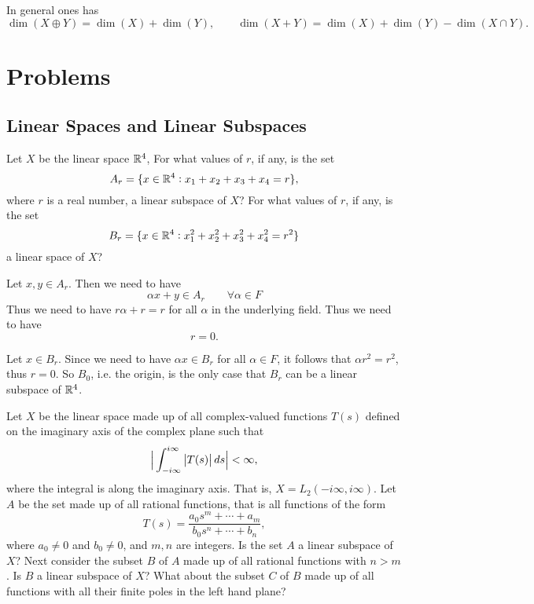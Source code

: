 \begin{proposition}
	In general ones has
	\[ \dim(X\oplus Y) = \dim(X) + \dim (Y), \qquad \dim(X+Y) = \dim(X) +\dim(Y) - \dim(X\cap Y). \]
\end{proposition}
 
 


\section{Problems}

\subsection{Linear Spaces and Linear Subspaces}
\begin{problem}
	Let $ X $ be the linear space $ \mathbb{R}^4 $, For what values of $ r $, if any, is the set
	\[ A_r = \{x\in\mathbb{R}^4: x_1+x_2+x_3+x_4 = r\}, \]
	where $ r $ is a real number, a linear subspace of $ X $? For what values of $ r $, if any,
	is the set
	\[ B_r = \{x\in \mathbb{R}^4: x_1^2 + x_2^2 + x_3^2+x_4^2 = r^2\} \]
	a linear space of $ X $?
\end{problem}

\begin{solution}
	Let $ x,y \in A_r $. Then we need to have
	\[ \alpha x + y \in A_r \qquad \forall\alpha\in F \]
	Thus we need to have $ r\alpha + r = r $ for all $ \alpha $ in the underlying field. Thus we need to have
	\[ r = 0. \]
	
	Let $ x \in B_r $. Since we need to have $ \alpha x \in B_r $ for all $ \alpha\in F $, it follows that $ \alpha r^2 = r^2 $, thus $ r=0 $. So $ B_0 $, i.e. the origin, is the only case that $ B_r $ can be a linear subspace of $ \mathbb{R}^4 $.
\end{solution}


\begin{problem}
	Let $ X $ be the linear space made up of all complex-valued functions $ T(s) $ defined on the imaginary axis of the complex plane such that
	\[ \big|\int_{-i\infty}^{i\infty} \left|T(s)\right| ds\big|<\infty, \] 
	where the integral is along the imaginary axis. That is, $ X = L_2(-i\infty,i\infty) $. Let $ A $ be the set made up of all rational functions, that is all functions of the form
	\[ T(s) = \frac{a_0s^m + \cdots + a_m}{b_0s^n + \cdots + b_n}, \]
	where $ a_0 \neq0 $ and $ b_0 \neq 0 $, and $ m,n $ are integers. Is the set $ A $ a linear subspace of $ X $? Next consider the subset $ B $ of $ A $ made up of all rational functions with $ n>m$. Is $ B $ a linear subspace of $ X $? What about the subset $ C $ of $ B $ made up of all functions with all their finite poles in the left hand plane?
\end{problem}

